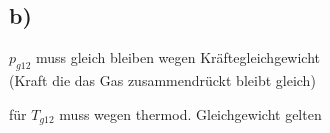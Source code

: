

\subsection*{b)}
$p_{g12}$ muss gleich bleiben wegen Kräftegleichgewicht \\
(Kraft die das Gas zusammendrückt bleibt gleich)

für $T_{g12}$ muss wegen thermod. Gleichgewicht gelten